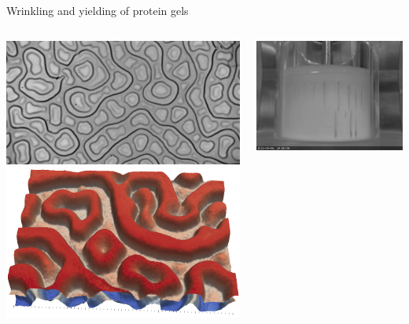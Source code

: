 \documentclass{beamer}
\begin{document}
\begin{frame}{Wrinkling and yielding of protein gels}
\begin{columns}
\includegraphics[width=\columnwidth]{pattern_100um.jpg}\\
\includegraphics[width=\columnwidth]{collage_cut}

\includegraphics[width=\columnwidth]{gap1mm_Y191_SSC300.jpg}


\end{columns}

\end{frame}
\end{document}
